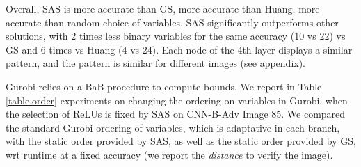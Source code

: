 Overall, {\sf SAS} is more accurate than GS, more accurate than Huang, more accurate than random choice of variables. {\sf SAS} significantly outperforms other solutions, 
with 2 times less binary variables for the same accuracy (10 vs 22) vs {\sf GS} and 6 times vs Huang \cite{DivideAndSlide} (4 vs 24).
Each node of the 4th layer displays a similar pattern, and the pattern is similar for different images (see appendix).

\smallskip

Gurobi relies on a BaB procedure to compute bounds. We report in Table \ref{table.order} experiments on changing the ordering on variables in Gurobi, when the selection of ReLUs is fixed by {\sf SAS} on CNN-B-Adv Image 85. We compared 
the standard Gurobi ordering of variables, which is adaptative in each branch, 
with the static order provided by {\sf SAS}, as well as the static order provided by GS, wrt runtime at a fixed accuracy (we report the {\em distance} to verify the image).






